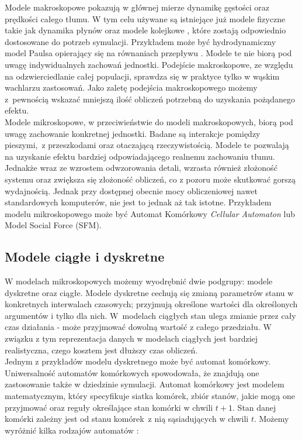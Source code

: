 Modele makroskopowe pokazują w głównej mierze dynamikę gęstości oraz prędkości całego tłumu. W tym celu używane są istniejące już modele fizyczne takie jak dynamika płynów oraz modele kolejkowe \cite{relativeVelocity}, które zostają odpowiednio dostosowane do potrzeb symulacji. Przykładem może być hydrodynamiczny model Paulsa opierający się na równaniach przepływu \cite{ArchitekturaModelowania}. Modele te nie biorą pod uwagę indywidualnych zachowań jednostki. Podejście makroskopowe, ze względu na odzwierciedlanie całej populacji, sprawdza się w praktyce tylko w wąskim wachlarzu zastosowań. Jako zaletę podejścia makroskopowego możemy z~pewnością wskazać mniejszą ilość obliczeń potrzebną do uzyskania pożądanego efektu. \\

Modele mikroskopowe, w przeciwieństwie do modeli makroskopowych, biorą pod uwagę zachowanie konkretnej jednostki. Badane są interakcje pomiędzy pieszymi,~z przeszkodami oraz otaczającą rzeczywistością. Modele te pozwalają na uzyskanie efektu bardziej odpowiadającego realnemu zachowaniu tłumu. Jednakże wraz ze wzrostem odwzorowania detali, wzrasta również złożoność systemu oraz zwiększa się złożoność obliczeń, co z pozoru może skutkować gorszą wydajnością. Jednak przy dostępnej obecnie mocy obliczeniowej nawet standardowych komputerów, nie jest to jednak aż tak istotne. Przykładem modelu mikroskopowego może być Automat Komórkowy \textit{Cellular Automaton} lub Model Social Force (SFM). 

\subsection{Modele ciągłe i dyskretne}

W modelach mikroskopowych możemy wyodrębnić dwie podgrupy: modele dyskretne oraz ciągłe. Modele dyskretne cechują się zmianą parametrów stanu w konkretnych interwalach czasowych; przyjmują określone wartości dla określonych argumentów i tylko dla nich. W~modelach ciągłych stan ulega zmianie przez cały czas działania - może przyjmować dowolną wartość z całego przedziału. W związku z tym reprezentacja danych w modelach ciągłych jest bardziej realistyczna, czego kosztem jest dłuższy czas obliczeń. \\

Jednym z przykładów modelu dyskretnego może być automat komórkowy. Uniwersalność automatów komórkowych spowodowała, że znajdują one zastosowanie także w dziedzinie symulacji. Automat komórkowy jest modelem matematycznym, który specyfikuje siatka komórek, zbiór stanów, jakie mogą one przyjmować oraz reguły określające stan komórki w chwili $t + 1$. Stan danej komórki zależny jest od stanu komórek~z nią sąsiadujących w chwili $t$. Możemy wyróżnić kilka rodzajów automatów \cite{modelowanieDynamikiTlumu}:

